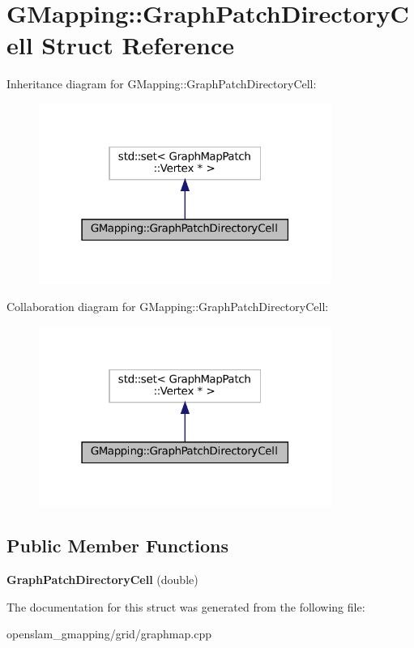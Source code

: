 \hypertarget{structGMapping_1_1GraphPatchDirectoryCell}{}\section{G\+Mapping\+:\+:Graph\+Patch\+Directory\+Cell Struct Reference}
\label{structGMapping_1_1GraphPatchDirectoryCell}


Inheritance diagram for G\+Mapping\+:\+:Graph\+Patch\+Directory\+Cell\+:
\nopagebreak
\begin{figure}[H]
\begin{center}
\leavevmode
\includegraphics[width=271pt]{structGMapping_1_1GraphPatchDirectoryCell__inherit__graph}
\end{center}
\end{figure}


Collaboration diagram for G\+Mapping\+:\+:Graph\+Patch\+Directory\+Cell\+:
\nopagebreak
\begin{figure}[H]
\begin{center}
\leavevmode
\includegraphics[width=271pt]{structGMapping_1_1GraphPatchDirectoryCell__coll__graph}
\end{center}
\end{figure}
\subsection*{Public Member Functions}
\begin{DoxyCompactItemize}
\item 
\mbox{\label{structGMapping_1_1GraphPatchDirectoryCell_a2ce65fccf1ce481edc8e33900bb9ec7f}} 
{\bfseries Graph\+Patch\+Directory\+Cell} (double)
\end{DoxyCompactItemize}


The documentation for this struct was generated from the following file\+:\begin{DoxyCompactItemize}
\item 
openslam\+\_\+gmapping/grid/graphmap.\+cpp\end{DoxyCompactItemize}
